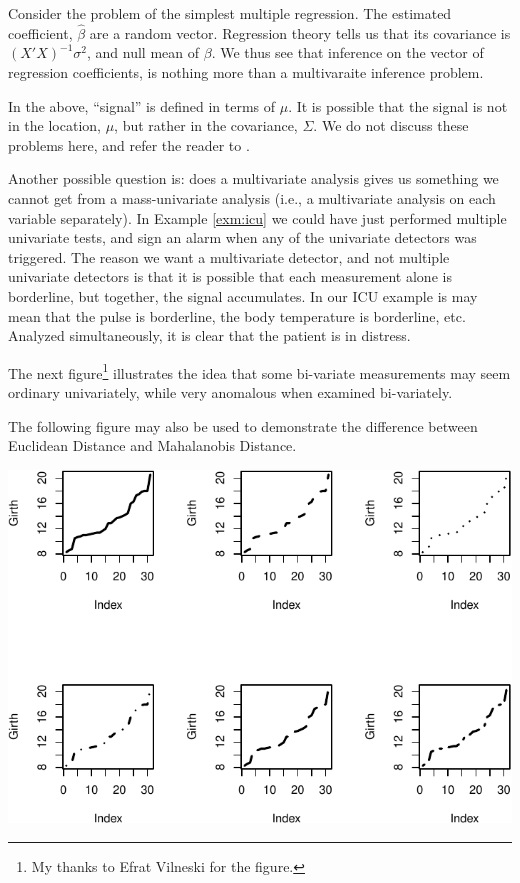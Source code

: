 \documentclass[]{book}
\theoremstyle{definition}
\theoremstyle{definition}
\theoremstyle{definition}
\theoremstyle{remark}
\let\BeginKnitrBlock\begin \let\EndKnitrBlock\end
\begin{document}
\BeginKnitrBlock{example}
\protect\hypertarget{exm:regression}{}{\label{exm:regression} }Consider the problem of the simplest multiple regression.
The estimated coefficient, \(\hat \beta\) are a random vector.
Regression theory tells us that its covariance is \((X'X)^{-1}\sigma^2\), and null mean of \(\beta\).
We thus see that inference on the vector of regression coefficients, is nothing more than a multivaraite inference problem.
\EndKnitrBlock{example}

\BeginKnitrBlock{remark}
{}In the above, ``signal'' is defined in terms of \(\mu\).
It is possible that the signal is not in the location, \(\mu\), but rather in the covariance, \(\Sigma\).
We do not discuss these problems here, and refer the reader to \citet{nadler2008finite}.
\EndKnitrBlock{remark}

Another possible question is: does a multivariate analysis gives us something we cannot get from a mass-univariate analysis (i.e., a multivariate analysis on each variable separately).
In Example \ref{exm:icu} we could have just performed multiple univariate tests, and sign an alarm when any of the univariate detectors was triggered.
The reason we want a multivariate detector, and not multiple univariate detectors is that it is possible that each measurement alone is borderline, but together, the signal accumulates.
In our ICU example is may mean that the pulse is borderline, the body temperature is borderline, etc. Analyzed simultaneously, it is clear that the patient is in distress.

The next figure\footnote{My thanks to Efrat Vilneski for the figure.} illustrates the idea that some bi-variate measurements may seem ordinary univariately, while very anomalous when examined bi-variately.

\BeginKnitrBlock{remark}
{}The following figure may also be used to demonstrate the difference between Euclidean Distance and Mahalanobis Distance.
\EndKnitrBlock{remark}

\includegraphics[width=0.5\linewidth]{Rcourse_files/figure-latex/unnamed-chunk-209-1}
\end{document}
